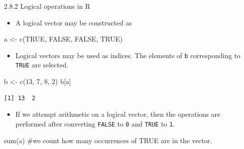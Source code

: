 \documentclass[
  9pt,
  a4paper,
  ignorenonframetext,
  notheorems]{beamer}
\newenvironment{Shaded}{\begin{snugshade}}{\end{snugshade}}
\newcommand{\CommentTok}[1]{\textcolor[rgb]{0.37,0.37,0.37}{#1}}
\newcommand{\ConstantTok}[1]{\textcolor[rgb]{0.56,0.35,0.01}{#1}}
\newcommand{\DecValTok}[1]{\textcolor[rgb]{0.68,0.00,0.00}{#1}}
\newcommand{\FunctionTok}[1]{\textcolor[rgb]{0.28,0.35,0.67}{#1}}
\newcommand{\NormalTok}[1]{\textcolor[rgb]{0.00,0.23,0.31}{#1}}
\newcommand{\OtherTok}[1]{\textcolor[rgb]{0.00,0.23,0.31}{#1}}
\providecommand{\tightlist}{%
  \setlength{\itemsep}{0pt}\setlength{\parskip}{0pt}}\usepackage{longtable,booktabs,array}
\begin{document}
\begin{frame}[fragile]
\begin{block}{2.8.2 Logical operations in R}
\protect\hypertarget{logical-operations-in-r}{}
\begin{itemize}
\tightlist
\item
  A logical vector may be constructed as
\end{itemize}

\begin{Shaded}
\begin{Highlighting}[]
\NormalTok{a }\OtherTok{\textless{}{-}} \FunctionTok{c}\NormalTok{(}\ConstantTok{TRUE}\NormalTok{, }\ConstantTok{FALSE}\NormalTok{, }\ConstantTok{FALSE}\NormalTok{, }\ConstantTok{TRUE}\NormalTok{)}
\end{Highlighting}
\end{Shaded}

\begin{itemize}
\tightlist
\item
  Logical vectors may be used as indices. The elements of \texttt{b}
  corresponding to \texttt{TRUE} are selected.
\end{itemize}

\begin{Shaded}
\begin{Highlighting}[]
\NormalTok{b }\OtherTok{\textless{}{-}} \FunctionTok{c}\NormalTok{(}\DecValTok{13}\NormalTok{, }\DecValTok{7}\NormalTok{, }\DecValTok{8}\NormalTok{, }\DecValTok{2}\NormalTok{) }
\NormalTok{b[a]}
\end{Highlighting}
\end{Shaded}

\begin{verbatim}
[1] 13  2
\end{verbatim}

\begin{itemize}
\tightlist
\item
  If we attempt arithmetic on a logical vector, then the operations are
  performed after converting \texttt{FALSE} to \texttt{0} and
  \texttt{TRUE} to \texttt{1}.
\end{itemize}

\begin{Shaded}
\begin{Highlighting}[]
\FunctionTok{sum}\NormalTok{(a) }\CommentTok{\#we count how many occurrences of TRUE are in the vector.}
\end{Highlighting}
\end{Shaded}


\end{block}
\end{frame}
\end{document}
